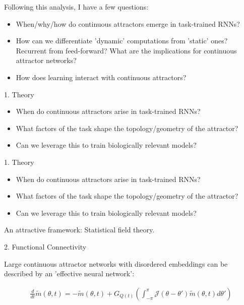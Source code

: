 \documentclass{beamer}
\begin{document}
\begin{frame}
    Following this analysis, I have a few questions:

    \begin{itemize}
        \item<1-> When/why/how do continuous attractors emerge in task-trained RNNs?
        \item<2-> How can we differentiate 'dynamic' computations from 'static' ones? Recurrent from feed-forward? What are the implications for continuous attractor networks?
        \item<3-> How does learning interact with continuous attractors?
    \end{itemize}
\end{frame}

\begin{frame}{1. Theory}

    \begin{itemize}
        \item<1-> When do continuous attractors arise in task-trained RNNs?
        \item<2-> What factors of the task shape the topology/geometry of the attractor?
        \item<3-> Can we leverage this to train biologically relevant models?
    \end{itemize}
    
\end{frame}

\begin{frame}{1. Theory}

    \begin{itemize}
        \item When do continuous attractors arise in task-trained RNNs?
        \item What factors of the task shape the topology/geometry of the attractor?
        \item Can we leverage this to train biologically relevant models?
    \end{itemize}

    \medskip
    An attractive framework: Statistical field theory.
    
\end{frame}

\begin{frame}{2. Functional Connectivity}

    Large continuous attractor networks with disordered embeddings can be described by an 'effective neural network':

    \begin{align*}
        \frac{d}{dt} \tilde m(\theta, t) = - \tilde m(\theta, t) + G_{Q(t)} \left(
            \int_{-\pi}^{\pi} \mathcal{J}(\theta - \theta') \tilde m(\theta, t) d \theta'
        \right)
    \end{align*}

\end{frame}
\end{document}
